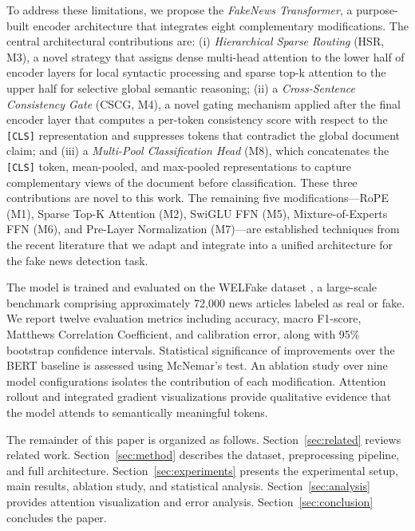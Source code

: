 \documentclass[conference]{IEEEtran}
\begin{document}
To address these limitations, we propose the \textit{FakeNews Transformer}, a purpose-built encoder architecture that integrates eight complementary modifications. The central architectural contributions are: (i) \textit{Hierarchical Sparse Routing} (HSR, M3), a novel strategy that assigns dense multi-head attention to the lower half of encoder layers for local syntactic processing and sparse top-k attention to the upper half for selective global semantic reasoning; (ii) a \textit{Cross-Sentence Consistency Gate} (CSCG, M4), a novel gating mechanism applied after the final encoder layer that computes a per-token consistency score with respect to the \texttt{[CLS]} representation and suppresses tokens that contradict the global document claim; and (iii) a \textit{Multi-Pool Classification Head} (M8), which concatenates the \texttt{[CLS]} token, mean-pooled, and max-pooled representations to capture complementary views of the document before classification. These three contributions are novel to this work. The remaining five modifications---RoPE (M1), Sparse Top-K Attention (M2), SwiGLU FFN (M5), Mixture-of-Experts FFN (M6), and Pre-Layer Normalization (M7)---are established techniques from the recent literature that we adapt and integrate into a unified architecture for the fake news detection task.

The model is trained and evaluated on the WELFake dataset \cite{verma2021welfake}, a large-scale benchmark comprising approximately 72,000 news articles labeled as real or fake. We report twelve evaluation metrics including accuracy, macro F1-score, Matthews Correlation Coefficient, and calibration error, along with 95\% bootstrap confidence intervals. Statistical significance of improvements over the BERT baseline is assessed using McNemar's test. An ablation study over nine model configurations isolates the contribution of each modification. Attention rollout \cite{abnar2020quantifying} and integrated gradient \cite{sundararajan2017axiomatic} visualizations provide qualitative evidence that the model attends to semantically meaningful tokens.

The remainder of this paper is organized as follows. Section~\ref{sec:related} reviews related work. Section~\ref{sec:method} describes the dataset, preprocessing pipeline, and full architecture. Section~\ref{sec:experiments} presents the experimental setup, main results, ablation study, and statistical analysis. Section~\ref{sec:analysis} provides attention visualization and error analysis. Section~\ref{sec:conclusion} concludes the paper.
\end{document}

